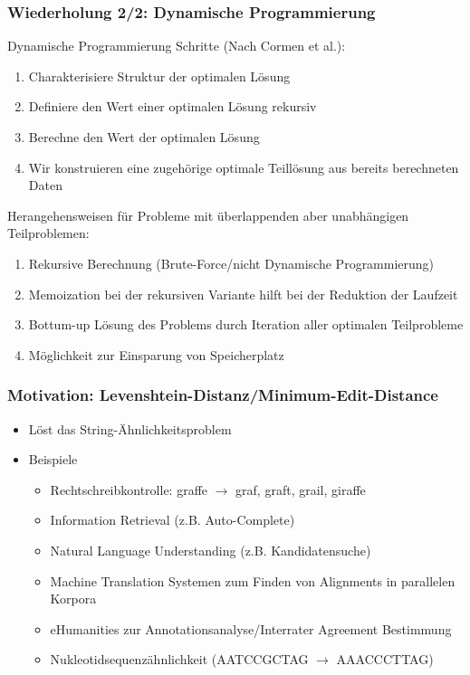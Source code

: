 \documentclass[aspectratio=169]{beamer}
\begin{document}
\begin{frame}[fragile]\frametitle{Wiederholung 2/2: Dynamische Programmierung}

Dynamische Programmierung Schritte (Nach Cormen et al.):
\begin{enumerate}
    \item Charakterisiere Struktur der optimalen Lösung
    \item Definiere den Wert einer optimalen Lösung rekursiv
    \item Berechne den Wert der optimalen Lösung
    \item Wir konstruieren eine zugehörige optimale Teillösung aus bereits berechneten Daten            
\end{enumerate}
    \pause
Herangehensweisen für Probleme mit überlappenden aber unabhängigen Teilproblemen:
\begin{enumerate}
    \item Rekursive Berechnung (Brute-Force/nicht Dynamische Programmierung)%
    \item Memoization bei der rekursiven Variante hilft bei der Reduktion der Laufzeit %
    \item Bottum-up Lösung des Problems durch Iteration aller optimalen Teilprobleme
    \item Möglichkeit zur Einsparung von Speicherplatz
\end{enumerate}

\end{frame}

\begin{frame} 
\frametitle{Motivation: Levenshtein-Distanz/Minimum-Edit-Distance}

\begin{itemize}
    \item Löst das String-Ähnlichkeitsproblem
    \pause
    \item Beispiele
    \begin{itemize}
        \item Rechtschreibkontrolle: graffe $\rightarrow$ graf, graft, grail, giraffe 
        \item Information Retrieval (z.B. Auto-Complete)  
        \item Natural Language Understanding (z.B. Kandidatensuche) 
        \item Machine Translation Systemen zum Finden von Alignments in parallelen Korpora 
        \item eHumanities zur Annotationsanalyse/Interrater Agreement Bestimmung 
        \item Nukleotidsequenzähnlichkeit (AATCCGCTAG $\rightarrow$ AAACCCTTAG)
    \end{itemize}
\end{itemize}
\end{frame}
\end{document}
